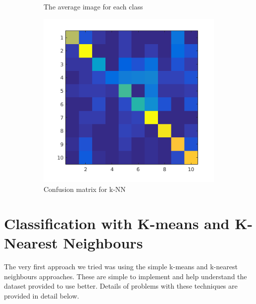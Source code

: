 \documentclass{article} %
\begin{document}
\begin{figure}[h]
\begin{subfigure}{.2\linewidth}
        \caption{The average image for each class}
        \end{subfigure}
        \begin{subfigure}{.2\linewidth}
            \centering
            \includegraphics[width=.5\linewidth]{knn-confusion.png}
            \caption{Confusion matrix for k-NN}
        \end{subfigure}
        \caption{}
    \end{figure}
    
    
    

\section{Classification with K-means and K-Nearest Neighbours}
    The very first approach we tried was using the simple k-means and k-nearest neighbours approaches. These are simple to implement and help understand the dataset provided to use better. Details of problems with these techniques are provided in detail below.
\end{document}
